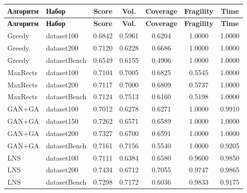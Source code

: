 \documentclass[14pt,a4paper]{extarticle}
\begin{document}
\small
\begin{longtable}{@{}p{}p{}@{\hspace{1.0em}}ccccc@{}}
\toprule
\textbf{Алгоритм} & \textbf{Набор} & \textbf{Score} & \textbf{Vol.} & \textbf{Coverage} & \textbf{Fragility} & \textbf{Time} \\
\midrule
\endfirsthead
\toprule
\textbf{Алгоритм} & \textbf{Набор} & \textbf{Score} & \textbf{Vol.} & \textbf{Coverage} & \textbf{Fragility} & \textbf{Time} \\
\midrule
\endhead
Greedy & dataset100 & 0.6842 & 0.5961 & 0.6204 & 1.0000 & 1.0000 \\
Greedy & dataset200 & 0.7120 & 0.6228 & 0.6686 & 1.0000 & 1.0000 \\
Greedy & datasetBench & 0.6549 & 0.6155 & 0.4906 & 1.0000 & 1.0000 \\
MaxRects & dataset100 & 0.7104 & 0.7005 & 0.6825 & 0.5545 & 1.0000 \\
MaxRects & dataset200 & 0.7117 & 0.7000 & 0.6809 & 0.5737 & 1.0000 \\
MaxRects & datasetBench & 0.7124 & 0.7513 & 0.6160 & 0.5198 & 1.0000 \\
GAN+GA & dataset100 & 0.7012 & 0.6278 & 0.6271 & 1.0000 & 0.9910 \\
GAN+GA & dataset150 & 0.7262 & 0.6571 & 0.6589 & 1.0000 & 1.0000 \\
GAN+GA & dataset200 & 0.7327 & 0.6700 & 0.6591 & 1.0000 & 1.0000 \\
GAN+GA & datasetBench & 0.7161 & 0.7156 & 0.5540 & 1.0000 & 0.9205 \\
LNS & dataset100 & 0.7111 & 0.6384 & 0.6580 & 0.9600 & 0.9850 \\
LNS & dataset200 & 0.7434 & 0.6712 & 0.7055 & 0.9747 & 0.9865 \\
LNS & datasetBench & 0.7298 & 0.7172 & 0.6036 & 0.9833 & 0.9175 \\
\bottomrule
\end{longtable}
\normalsize

\pagebreak
\end{document}
